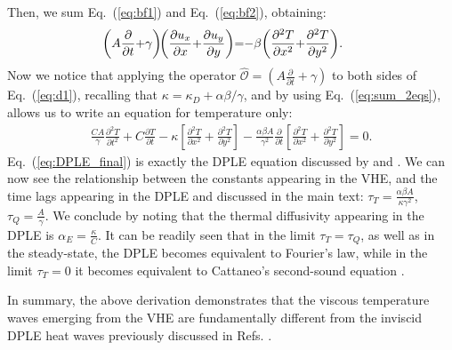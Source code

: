 \documentclass[
prb,
twocolumn,
superscriptaddress,
 amsmath,amssymb,
 aps,
longbibliography,
]{revtex4-2}
\begin{document}
Then, we sum Eq.~(\ref{eq:bf1}) and Eq.~(\ref{eq:bf2}), obtaining:
\begin{eqnarray}
\left(A\frac{\partial}{\partial t} {+} \gamma\right)\!\! \left(\frac{\partial u_x}{\partial x}{+}
\frac{\partial u_y}{\partial y}\right)\!
 {=} {-} \beta\bigg(\frac{\partial^2 T}{\partial x^2}{+}\frac{\partial^2 T}{\partial y^2}\bigg).\hspace*{5mm}
 \label{eq:sum_2eqs}
\end{eqnarray}
Now we notice that applying the operator $\hat{\mathcal O}=\left(A\frac{\partial}{\partial t} {+} \gamma\right)$ to both sides of Eq.~(\ref{eq:d1}), recalling that $\kappa=\kappa_D+\alpha\beta/\gamma$, and by using Eq.~(\ref{eq:sum_2eqs}), allows us to write an equation for temperature only:
\begin{equation}
\begin{gathered}
\frac{CA}{\gamma} \frac{\partial^2 T}{\partial t^2} {+} C\frac{\partial T}{\partial t} {-} \kappa\!\left[\!\frac{\partial^2 T}{\partial x^2} {+}\frac{\partial^2 T}{\partial y^2}\!\right]\!  {-}\frac{\alpha\beta A}{\gamma^2}\frac{\partial}{\partial t} \!\left[\frac{\partial^2 T}{\partial x^2} {+} \frac{\partial^2 T}{\partial y^2}\!\right]\! {=} 0.\label{eq:DPLE_final}
\end{gathered}
\end{equation}
Eq.~(\ref{eq:DPLE_final}) is exactly the DPLE equation discussed by \citet{joseph_heat_1989} and \citet{tzou_unified_1995}.
We can now see the relationship between the constants appearing in the VHE, and the time lags appearing in the DPLE \cite{tzou_unified_1995} and discussed in the main text: $\tau_T = \frac{\alpha\beta A}{ \kappa\gamma^2}$, $\tau_Q = \frac{A}{\gamma}$. We conclude by noting that the thermal diffusivity appearing in the DPLE is $\alpha_E = \frac{\kappa}{C}$.
It can be readily seen that in the limit $\tau_T=\tau_Q$, as well as in the steady-state, the DPLE becomes equivalent to Fourier's law, while in the limit $\tau_T=0$ it becomes equivalent to Cattaneo's second-sound equation \cite{tzou_unified_1995}.

In summary, the above derivation demonstrates that the viscous temperature waves emerging from the VHE are fundamentally different from the inviscid DPLE heat waves previously discussed in Refs. \cite{joseph_heat_1989,tzou_unified_1995,barletta_hyperbolic_1996,xu_thermal_2002,xu_thermal_2021}.
\end{document}
